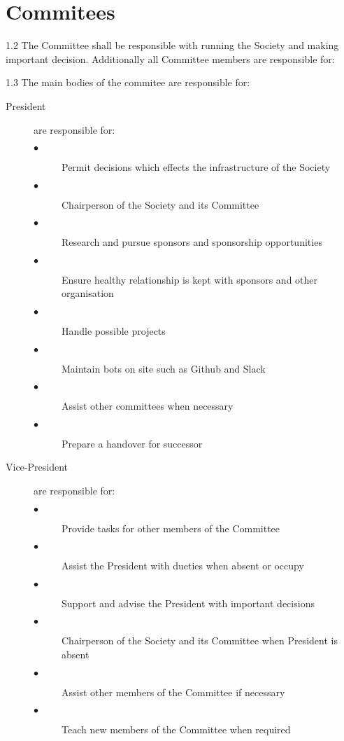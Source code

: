 \documentclass{report}
\begin{document}
  \section{Commitees}
  
  1.2 The Committee shall be responsible with running the Society and making important decision. Additionally all Committee members are responsible for:
  
  1.3 The main bodies of the commitee are responsible for:
  
  \begin{description}

    \item[President] are responsible for:
      \begin{description}
        \item[$\bullet$] Permit decisions which effects the infrastructure of the Society
        \item[$\bullet$] Chairperson of the Society and its Committee
        \item[$\bullet$] Research and pursue sponsors and sponsorship opportunities
        \item[$\bullet$] Ensure healthy relationship is kept with sponsors and
        other organisation
        \item[$\bullet$] Handle possible projects
        \item[$\bullet$] Maintain bots on site such as Github and Slack
        \item[$\bullet$] Assist other committees when necessary 
        \item[$\bullet$] Prepare a handover for successor
      \end{description}

    \item[Vice-President] are responsible for: 
     \begin{description}
        \item[$\bullet$] Provide tasks for other members of the Committee
        \item[$\bullet$] Assist the President with dueties when absent or occupy 
        \item[$\bullet$] Support and advise the President with important decisions
        \item[$\bullet$] Chairperson of the Society and its Committee when 
        President is absent
        \item[$\bullet$] Assist other members of the Committee if necessary
        \item[$\bullet$] Teach new members of the Committee when required
      \end{description}


\end{description}
\end{document}
